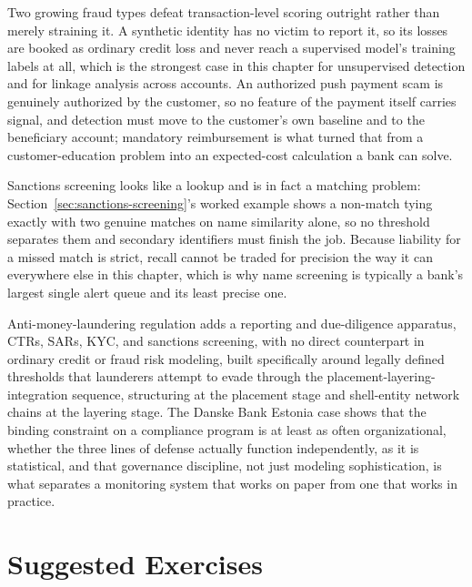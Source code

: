 \documentclass[../ai_in_finance]{subfiles}
\begin{document}
Two growing fraud types defeat transaction-level scoring outright rather than merely straining it. A synthetic identity has no victim to report it, so its losses are booked as ordinary credit loss and never reach a supervised model's training labels at all, which is the strongest case in this chapter for unsupervised detection and for linkage analysis across accounts. An authorized push payment scam is genuinely authorized by the customer, so no feature of the payment itself carries signal, and detection must move to the customer's own baseline and to the beneficiary account; mandatory reimbursement is what turned that from a customer-education problem into an expected-cost calculation a bank can solve.

Sanctions screening looks like a lookup and is in fact a matching problem: Section~\ref{sec:sanctions-screening}'s worked example shows a non-match tying exactly with two genuine matches on name similarity alone, so no threshold separates them and secondary identifiers must finish the job. Because liability for a missed match is strict, recall cannot be traded for precision the way it can everywhere else in this chapter, which is why name screening is typically a bank's largest single alert queue and its least precise one.

Anti-money-laundering regulation adds a reporting and due-diligence apparatus, CTRs, SARs, KYC, and sanctions screening, with no direct counterpart in ordinary credit or fraud risk modeling, built specifically around legally defined thresholds that launderers attempt to evade through the placement-layering-integration sequence, structuring at the placement stage and shell-entity network chains at the layering stage. The Danske Bank Estonia case shows that the binding constraint on a compliance program is at least as often organizational, whether the three lines of defense actually function independently, as it is statistical, and that governance discipline, not just modeling sophistication, is what separates a monitoring system that works on paper from one that works in practice.

\section{Suggested Exercises}
\end{document}
